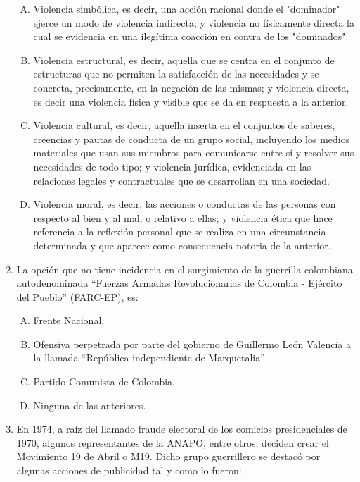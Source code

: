 \begin{enumerate}
\begin{enumerate}[(A)]
\item   Violencia simbólica, es decir, una acción racional donde el "dominador" ejerce un modo de violencia indirecta; y violencia no físicamente directa la cual se evidencia en una ilegítima coacción en contra de los "dominados".
 \item  Violencia estructural, es decir, aquella que se centra en el conjunto de estructuras que no permiten la satisfacción de las necesidades y se concreta, precisamente, en la negación de las mismas; y violencia directa, es decir una violencia física y visible que se da en respuesta a la anterior.
\item Violencia cultural, es decir, aquella inserta en el conjuntos de saberes, creencias y pautas de conducta de un grupo social, incluyendo los medios materiales que usan sus miembros para comunicarse entre sí y resolver sus necesidades de todo tipo; y violencia jurídica, evidenciada en las relaciones legales y contractuales que se desarrollan en una sociedad.
\item Violencia moral, es decir, las acciones o conductas de las personas con respecto al bien y al mal, o relativo a ellas; y violencia ética que hace referencia a la reflexión personal que se realiza en una circunstancia determinada y que aparece como consecuencia notoria de la anterior.
\end{enumerate}


\newpage
\item La opción que no tiene incidencia en el surgimiento de la guerrilla colombiana autodenominada ``Fuerzas Armadas Revolucionarias de Colombia - Ejército del Pueblo'' (FARC-EP), es:\label{sociii-9}


\begin{enumerate}[(A)]
\item   Frente Nacional.
 \item  Ofensiva perpetrada por parte del gobierno de Guillermo León Valencia a la llamada ``República independiente de Marquetalia''
\item Partido Comunista de Colombia.
\item Ninguna de las anteriores.
\end{enumerate}



\item En 1974, a raíz del llamado fraude electoral de los comicios presidenciales de 1970, algunos representantes de la ANAPO, entre otros, deciden crear el Movimiento 19 de Abril o M19. Dicho grupo guerrillero se destacó por algunas acciones de publicidad tal y como lo fueron:\label{sociii-10}



\end{enumerate}
